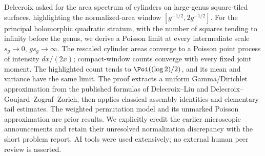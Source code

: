 
Delecroix asked for the area spectrum of cylinders on large-genus square-tiled surfaces, highlighting the normalized-area window $[g^{-1/2},2g^{-1/2}]$. For the principal holomorphic quadratic stratum, with the number of squares tending to infinity before the genus, we derive a Poisson limit at every intermediate scale $s_g\to0$, $gs_g\to\infty$. The rescaled cylinder areas converge to a Poisson point process of intensity $dx/(2x)$; compact-window counts converge with every fixed joint moment. The highlighted count tends to $\Poi((\log2)/2)$, and its mean and variance have the same limit. The proof extracts a uniform Gamma/Dirichlet approximation from the published formulas of Delecroix--Liu and Delecroix--Goujard--Zograf--Zorich, then applies classical assembly identities and elementary tail estimates. The weighted permutation model and its unmarked Poisson approximation are prior results. We explicitly credit the earlier microscopic announcements and retain their unresolved normalization discrepancy with the short problem report. AI tools were used extensively; no external human peer review is asserted.
